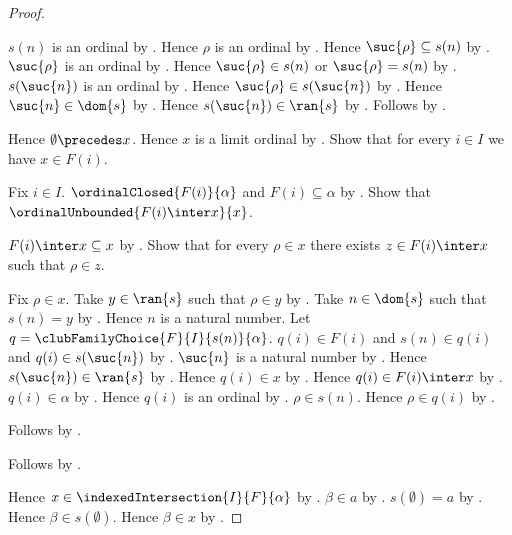 \begin{proof}
\begin{subproof}
        $s(n)$ is an ordinal
            by .
        Hence $\rho$ is an ordinal by .
        Hence $\suc{\rho}\subseteq s(n)$
            by .
        $\suc{\rho}$ is an ordinal by .
        Hence $\suc{\rho}\in s(n)$ or $\suc{\rho}=s(n)$
            by .
        $s(\suc{n})$ is an ordinal
            by .
        Hence $\suc{\rho}\in s(\suc{n})$
            by .
        Hence $\suc{n}\in\dom{s}$ by .
        Hence $s(\suc{n})\in\ran{s}$ by .
        Follows by .
    \end{subproof}
    Hence $\emptyset\precedes x$.
    Hence $x$ is a limit ordinal by .
    Show that for every $i\in I$ we have $x\in F(i)$.
    \begin{subproof}
        Fix $i\in I$.
        $\ordinalClosed{F(i)}{\alpha}$ and $F(i)\subseteq\alpha$
            by .
        Show that $\ordinalUnbounded{F(i)\inter x}{x}$.
        \begin{subproof}
            $F(i)\inter x\subseteq x$ by .
            Show that for every $\rho\in x$ there exists
                $z\in F(i)\inter x$ such that $\rho\in z$.
            \begin{subproof}
                Fix $\rho\in x$.
                Take $y\in\ran{s}$ such that $\rho\in y$
                    by .
                Take $n\in\dom{s}$ such that $s(n)=y$
                    by .
                Hence $n$ is a natural number.
                Let $q=\clubFamilyChoice{F}{I}{s(n)}{\alpha}$.
                $q(i)\in F(i)$ and $s(n)\in q(i)$ and
                    $q(i)\in s(\suc{n})$
                    by .
                $\suc{n}$ is a natural number
                    by .
                Hence $s(\suc{n})\in\ran{s}$
                    by .
                Hence $q(i)\in x$ by .
                Hence $q(i)\in F(i)\inter x$ by .
                $q(i)\in\alpha$ by .
                Hence $q(i)$ is an ordinal
                    by .
                $\rho\in s(n)$.
                Hence $\rho\in q(i)$ by .
            \end{subproof}
            Follows by .
        \end{subproof}
        Follows by .
    \end{subproof}
    Hence $x\in\indexedIntersection{I}{F}{\alpha}$
        by .
    $\beta\in a$ by .
    $s(\emptyset)=a$ by .
    Hence $\beta\in s(\emptyset)$.
    Hence $\beta\in x$ by .
\end{proof}

